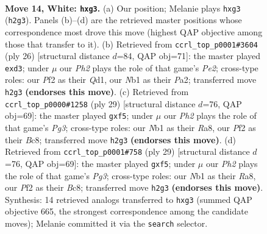 \documentclass[11pt]{article}
\begin{document}
\clearpage

\begin{figure}[p]\centering
\begin{subfigure}{0.46\textwidth}\centering
\resizebox{\linewidth}{!}{%
\newchessgame
\chessboard[
  setfen={rnbqk2r/8/2pb1np1/pp1p1p2/3P4/6p1/PP2PPBP/RNBQNRK1 w kq - 0 14},
  showmover=false,
  pgfstyle=straightmove, color=movearrow, markmove={h2-g3}
]}
\caption{}
\end{subfigure}\hfill
\begin{subfigure}{0.46\textwidth}\centering
\resizebox{\linewidth}{!}{%
\newchessgame
\chessboard[
  setfen={r1bqk2r/5ppp/2pb1n2/p2p4/N7/3p2P1/PP2PPBP/R1BQ1RK1 w kq - 0 14},
  showmover=false,
  pgfstyle=straightmove, color=movearrow, markmove={e2-d3}
]}
\caption{}
\end{subfigure}
\\[4pt]
\begin{subfigure}{0.46\textwidth}\centering
\resizebox{\linewidth}{!}{%
\newchessgame
\chessboard[
  setfen={r1bqnrk1/pp4b1/3p2p1/3PpP1p/7P/2NBBP2/PP1Q2P1/R3K2R b KQ - 0 15},
  showmover=false,
  pgfstyle=straightmove, color=movearrow, markmove={g6-f5}
]}
\caption{}
\end{subfigure}\hfill
\begin{subfigure}{0.46\textwidth}\centering
\resizebox{\linewidth}{!}{%
\newchessgame
\chessboard[
  setfen={r1bqnrk1/pp4b1/3p2p1/3PpP1p/7P/2NBBP2/PP1Q2P1/R3K2R b KQ - 0 15},
  showmover=false,
  pgfstyle=straightmove, color=movearrow, markmove={g6-f5}
]}
\caption{}
\end{subfigure}
\caption{\textbf{Move 14, White: \texttt{hxg3}.} (a) Our position; Melanie plays \texttt{hxg3} (\texttt{h2g3}). Panels (b)--(d) are the retrieved master positions whose correspondence most drove this move (highest QAP objective among those that transfer to it). (b) Retrieved from \texttt{ccrl\_top\_p0001\#3604} (ply 26) [structural distance $d$=84, QAP obj=71]: the master played \texttt{exd3}; under $\mu$ our \emph{Ph2} plays the role of that game's \emph{Pe2}; cross-type roles: our \emph{P}f2 as their \emph{Q}d1, our \emph{N}b1 as their \emph{P}a2; transferred move \texttt{h2g3} \textbf{(endorses this move)}. (c) Retrieved from \texttt{ccrl\_top\_p0000\#1258} (ply 29) [structural distance $d$=76, QAP obj=69]: the master played \texttt{gxf5}; under $\mu$ our \emph{Ph2} plays the role of that game's \emph{Pg3}; cross-type roles: our \emph{N}b1 as their \emph{R}a8, our \emph{P}f2 as their \emph{B}c8; transferred move \texttt{h2g3} \textbf{(endorses this move)}. (d) Retrieved from \texttt{ccrl\_top\_p0001\#758} (ply 29) [structural distance $d$=76, QAP obj=69]: the master played \texttt{gxf5}; under $\mu$ our \emph{Ph2} plays the role of that game's \emph{Pg3}; cross-type roles: our \emph{N}b1 as their \emph{R}a8, our \emph{P}f2 as their \emph{B}c8; transferred move \texttt{h2g3} \textbf{(endorses this move)}. Synthesis: 14 retrieved analogs transferred to \texttt{hxg3} (summed QAP objective 665, the strongest correspondence among the candidate moves); Melanie committed it via the \texttt{search} selector.}
\label{fig:thought-m26}
\end{figure}
\end{document}

